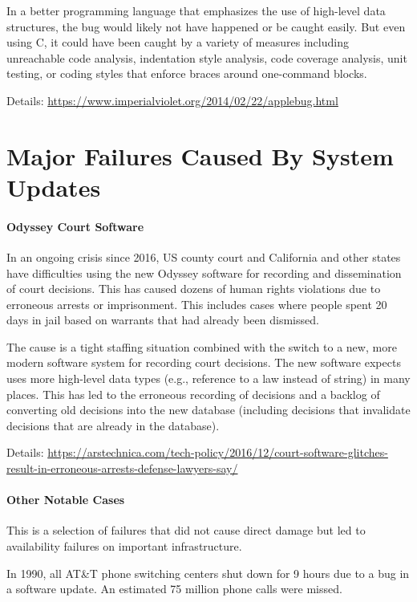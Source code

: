 In a better programming language that emphasizes the use of high-level data structures, the bug would likely not have happened or be caught easily.
But even using C, it could have been caught by a variety of measures including unreachable code analysis, indentation style analysis, code coverage analysis, unit testing, or coding styles that enforce braces around one-command blocks.
 
Details: \url{https://www.imperialviolet.org/2014/02/22/applebug.html}

\section{Major Failures Caused By System Updates}

\paragraph{Odyssey Court Software}
In an ongoing crisis since 2016, US county court and California and other states have difficulties using the new Odyssey software for recording and dissemination of court decisions.
This has caused dozens of human rights violations due to erroneous arrests or imprisonment.
This includes cases where people spent 20 days in jail based on warrants that had already been dismissed.

The cause is a tight staffing situation combined with the switch to a new, more modern software system for recording court decisions.
The new software expects uses more high-level data types (e.g., reference to a law instead of string) in many places.
This has led to the erroneous recording of decisions and a backlog of converting old decisions into the new database (including decisions that invalidate decisions that are already in the database).

Details: \url{https://arstechnica.com/tech-policy/2016/12/court-software-glitches-result-in-erroneous-arrests-defense-lawyers-say/}

\paragraph{Other Notable Cases}
This is a selection of failures that did not cause direct damage but led to availability failures on important infrastructure.

In 1990, all AT\&T phone switching centers shut down for 9 hours due to a bug in a software update.
An estimated 75 million phone calls were missed.

